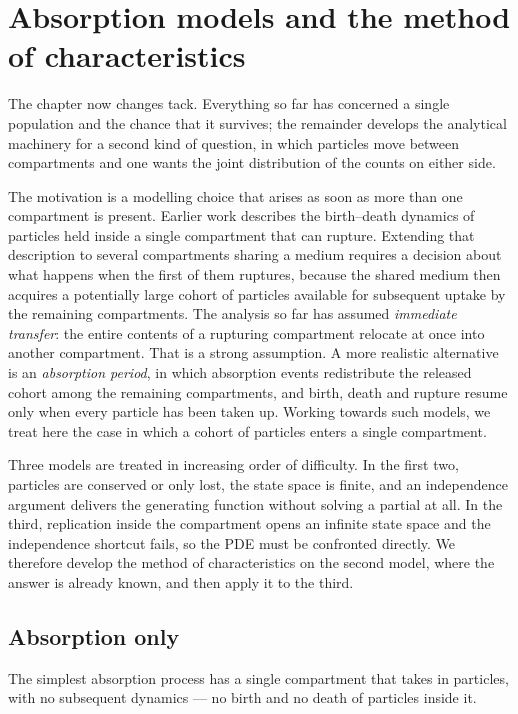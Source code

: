 \section{Absorption models and the method of characteristics}
\label{sec:moc}

The chapter now changes tack. Everything so far has concerned a single population and the
chance that it survives; the remainder develops the analytical machinery for a second kind
of question, in which particles move between compartments and one wants the joint
distribution of the counts on either side.

The motivation is a modelling choice that arises as soon as more than one compartment is
present. Earlier work describes the birth--death dynamics of particles held inside a single
compartment that can rupture. Extending that description to several compartments sharing a
medium requires a decision about what happens when the first of them ruptures, because the
shared medium then acquires a potentially large cohort of particles available for
subsequent uptake by the remaining compartments. The analysis so far has assumed
\emph{immediate transfer}: the entire contents of a rupturing compartment relocate at once
into another compartment. That is a strong assumption. A more realistic alternative is an
\emph{absorption period}, in which absorption events redistribute the released cohort among
the remaining compartments, and birth, death and rupture resume only when every particle
has been taken up. Working towards such models, we treat here the case in which a cohort of
particles enters a single compartment.

Three models are treated in increasing order of difficulty. In the first two, particles are
conserved or only lost, the state space is finite, and an independence argument delivers
the generating function without solving a partial \de{} at all. In the third, replication
inside the compartment opens an infinite state space and the independence shortcut fails,
so the PDE must be confronted directly. We therefore develop the method of characteristics
on the second model, where the answer is already known, and then apply it to the third.

\subsection{Absorption only}
\label{sec:absonly}

The simplest absorption process has a single compartment that takes in particles, with no
subsequent dynamics --- no birth and no death of particles inside it.

